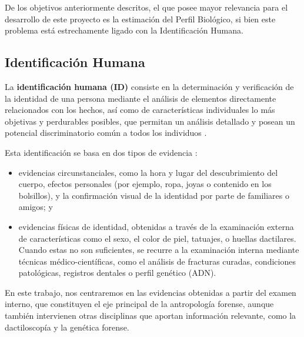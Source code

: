 De los objetivos anteriormente descritos, el que posee mayor relevancia para el desarrollo de este proyecto es la 
estimación del Perfil Biológico, si bien este problema está estrechamente ligado con la Identificación 
Humana.


\subsection{Identificación Humana}

La \textbf{identificación humana (ID)} consiste en la determinación y verificación de la identidad de una persona mediante el 
análisis de elementos directamente relacionados con los hechos, así como de características individuales lo más objetivas 
y perdurables posibles, que permitan un análisis detallado y posean un potencial discriminatorio común a todos los individuos 
\cite{lorente1999}. 

Esta identificación se basa en dos tipos de evidencia \cite{thompson2006}: 

\begin{itemize}

    \item evidencias circunstanciales, como la hora y lugar del descubrimiento del cuerpo, efectos personales (por ejemplo, 
    ropa, joyas o contenido en los bolsillos), y la confirmación visual de la identidad por parte de familiares o amigos; y

    \item evidencias físicas de identidad, obtenidas a través de la examinación externa de características como el sexo, 
    el color de piel, tatuajes, o huellas dactilares. Cuando estas no son suficientes, se recurre a la examinación interna 
    mediante técnicas médico-científicas, como el análisis de fracturas curadas, condiciones patológicas, registros dentales 
    o perfil genético (ADN).

\end{itemize}


En este trabajo, nos centraremos en las evidencias obtenidas a partir del examen interno, que constituyen el eje principal 
de la antropología forense, aunque también intervienen otras disciplinas que aportan información relevante, como la 
dactiloscopía y la genética forense.


